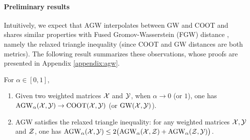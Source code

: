 \paragraph{Preliminary results}
Intuitively, we expect that AGW interpolates between GW and COOT and shares similar properties
with Fused Gromov-Wasserstein (FGW) distance \citep{Vayer19b}, namely
the relaxed triangle inequality (since COOT and GW distances are both metrics).
The following result summarizes these observations, whose proofs are presented in
Appendix \ref{appendix:agw}.
\begin{proposition}
\label{prop:basic_prop}
For $\alpha \in [0, 1]$,
\begin{enumerate}
    \item Given two weighted matrices $\mathcal X$ and $\mathcal Y$, when $\alpha \to 0$ (or $1$),
    one has $\text{AGW}_{\alpha}(\mathcal X, \mathcal Y) \to \text{COOT}(\mathcal X, \mathcal Y)$ (or $\text{GW}(\mathcal X, \mathcal Y)$).

    \item AGW satisfies the relaxed triangle inequality: for any weighted matrices $\mathcal X, \mathcal Y$
    and $\mathcal Z$, one has $\text{AGW}_{\alpha}(\mathcal X, \mathcal Y) \leq 2 \big( \text{AGW}_{\alpha}(\mathcal X, \mathcal Z)
    + \text{AGW}_{\alpha}(\mathcal Z,  \mathcal Y) \big)$.
\end{enumerate}
\end{proposition}

